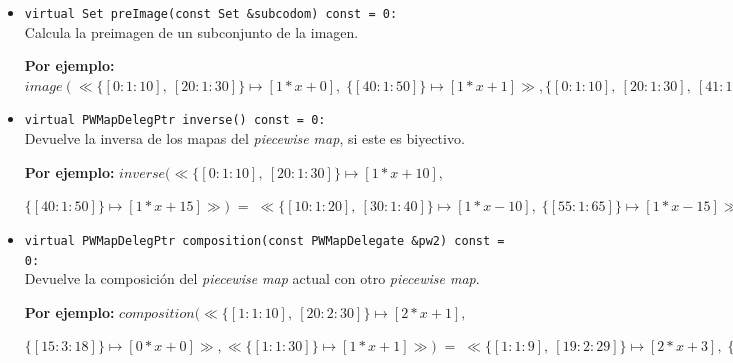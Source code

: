 \begin{itemize}
    \begin{center}
        \textbf{Por ejemplo:} $image(\ll\{[0:1:10],\ [20:1:30]\} \mapsto [1*x+0],\; \{[40:1:50]\} \mapsto [1*x+1]\gg,  \{[0:1:10],\ [20:1:30],\ [40:1:50]\})\;=\;\{[0:1:10],\ [20:1:30],\ [41:1:51]\}.$
    \end{center}

    \item \texttt{virtual Set preImage(const Set \&subcodom) const = 0:} \\
    Calcula la preimagen de un subconjunto de la imagen.

    \begin{center}
        \textbf{Por ejemplo:} $image(\ll\{[0:1:10],\ [20:1:30]\} \mapsto [1*x+0],\; \{[40:1:50]\} \mapsto [1*x+1]\gg, \{[0:1:10],\ [20:1:30],\ [41:1:51]\})\;= \; \{[0:1:10],\ [20:1:30],\ [40:1:50]\}.$
    \end{center}


    \item \texttt{virtual PWMapDelegPtr inverse() const = 0:} \\
    Devuelve la inversa de los mapas del \textit{piecewise map}, si este es biyectivo.

        \begin{center}
        \textbf{Por ejemplo:} $inverse(\ll\{[0:1:10],\ [20:1:30]\} \mapsto [1*x+10],\;$
        
        $ \{[40:1:50]\} \mapsto [1*x+15]\gg)\;=\;\ll\{[10:1:20],\ [30:1:40]\} \mapsto [1*x-10],\; \{[55:1:65]\} \mapsto [1*x-15]\gg.$
    \end{center}

    \item \texttt{virtual PWMapDelegPtr composition(const PWMapDelegate \&pw2) const = 0:} \\
    Devuelve la composición del \textit{piecewise map} actual con otro \textit{piecewise map}.

    \begin{center}
        \textbf{Por ejemplo:} $composition(\ll\{[1:1:10],\ [20:2:30]\} \mapsto [2*x+1],\; $
        
        $\{[15:3:18]\} \mapsto [0*x+0]\gg, \ll\{[1:1:30]\} \mapsto [1*x+1]\gg)\;=\;\ll\{[1:1:9],\ [19:2:29]\} \mapsto [2*x+3],\; \{[14:3:17]\} \mapsto [0*x+0]\gg.$
    \end{center}

    

\end{itemize}
